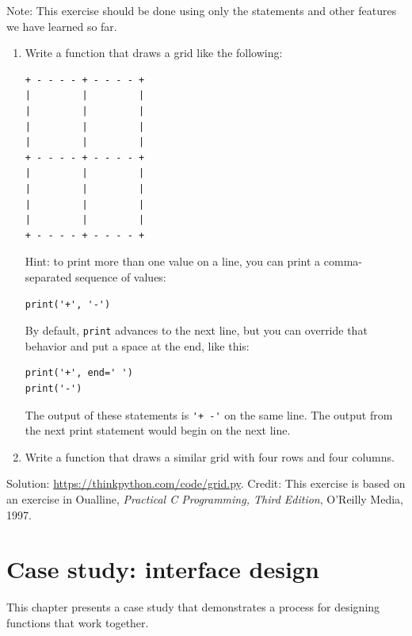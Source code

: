 \documentclass[10pt]{book}
\begin{document}
\begin{exercise}

Note: This exercise should be
done using only the statements and other features we have learned so
far.

\begin{enumerate}

\item Write a function that draws a grid like the following:

\begin{verbatim}
+ - - - - + - - - - +
|         |         |
|         |         |
|         |         |
|         |         |
+ - - - - + - - - - +
|         |         |
|         |         |
|         |         |
|         |         |
+ - - - - + - - - - +
\end{verbatim}
%
Hint: to print more than one value on a line, you can print
a comma-separated sequence of values:

\begin{verbatim}
print('+', '-')
\end{verbatim}
%
By default, {\tt print} advances to the next line, but you
can override that behavior and put a space at the end, like this:

\begin{verbatim}
print('+', end=' ')
print('-')
\end{verbatim}
%
The output of these statements is \verb"'+ -'" on the same line.
The output from the next print statement would begin on the next line.

\item Write a function that draws a similar grid
with four rows and four columns.

\end{enumerate}

Solution: \url{https://thinkpython.com/code/grid.py}.
Credit: This exercise is based on an exercise in Oualline, {\em
    Practical C Programming, Third Edition}, O'Reilly Media, 1997.

\end{exercise}





\chapter{Case study: interface design}
\label{turtlechap}

This chapter presents a case study that demonstrates a process for
designing functions that work together.
\end{document}
